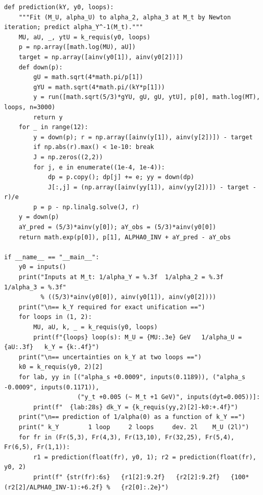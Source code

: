 \documentclass[11pt,a4paper]{article}
\begin{document}
\begin{lstlisting}
def prediction(kY, y0, loops):
    """Fit (M_U, alpha_U) to alpha_2, alpha_3 at M_t by Newton iteration; predict alpha_Y^-1(M_t)."""
    MU, aU, _, ytU = k_requis(y0, loops)
    p = np.array([math.log(MU), aU])
    target = np.array([ainv(y0[1]), ainv(y0[2])])
    def down(p):
        gU = math.sqrt(4*math.pi/p[1])
        gYU = math.sqrt(4*math.pi/(kY*p[1]))
        y = run([math.sqrt(5/3)*gYU, gU, gU, ytU], p[0], math.log(MT), loops, n=3000)
        return y
    for _ in range(12):
        y = down(p); r = np.array([ainv(y[1]), ainv(y[2])]) - target
        if np.abs(r).max() < 1e-10: break
        J = np.zeros((2,2))
        for j, e in enumerate((1e-4, 1e-4)):
            dp = p.copy(); dp[j] += e; yy = down(dp)
            J[:,j] = (np.array([ainv(yy[1]), ainv(yy[2])]) - target - r)/e
        p = p - np.linalg.solve(J, r)
    y = down(p)
    aY_pred = (5/3)*ainv(y[0]); aY_obs = (5/3)*ainv(y0[0])
    return math.exp(p[0]), p[1], ALPHA0_INV + aY_pred - aY_obs

if __name__ == "__main__":
    y0 = inputs()
    print("Inputs at M_t: 1/alpha_Y = %.3f  1/alpha_2 = %.3f  1/alpha_3 = %.3f"
          % ((5/3)*ainv(y0[0]), ainv(y0[1]), ainv(y0[2])))
    print("\n== k_Y required for exact unification ==")
    for loops in (1, 2):
        MU, aU, k, _ = k_requis(y0, loops)
        print(f"{loops} loop(s): M_U = {MU:.3e} GeV   1/alpha_U = {aU:.3f}   k_Y = {k:.4f}")
    print("\n== uncertainties on k_Y at two loops ==")
    k0 = k_requis(y0, 2)[2]
    for lab, yy in [("alpha_s +0.0009", inputs(0.1189)), ("alpha_s -0.0009", inputs(0.1171)),
                    ("y_t +0.005 (~ M_t +1 GeV)", inputs(dyt=0.005))]:
        print(f"  {lab:28s} dk_Y = {k_requis(yy,2)[2]-k0:+.4f}")
    print("\n== prediction of 1/alpha(0) as a function of k_Y ==")
    print(" k_Y        1 loop     2 loops     dev. 2l    M_U (2l)")
    for fr in (Fr(5,3), Fr(4,3), Fr(13,10), Fr(32,25), Fr(5,4), Fr(6,5), Fr(1,1)):
        r1 = prediction(float(fr), y0, 1); r2 = prediction(float(fr), y0, 2)
        print(f" {str(fr):6s}   {r1[2]:9.2f}   {r2[2]:9.2f}   {100*(r2[2]/ALPHA0_INV-1):+6.2f} %   {r2[0]:.2e}")
\end{lstlisting}
\end{document}
